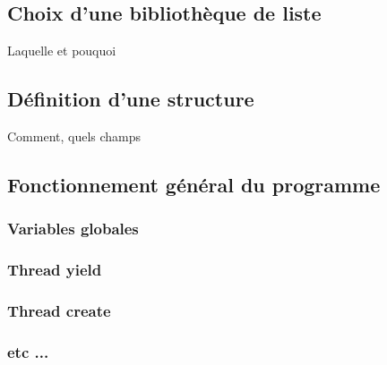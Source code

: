 \subsection{Choix d'une bibliothèque de liste}
Laquelle et pouquoi 


\subsection{Définition d'une structure}
Comment, quels champs 

\subsection{Fonctionnement général du programme}
\subsubsection{Variables globales}
\subsubsection{Thread yield}
\subsubsection{Thread create}
\subsubsection{etc ...}



